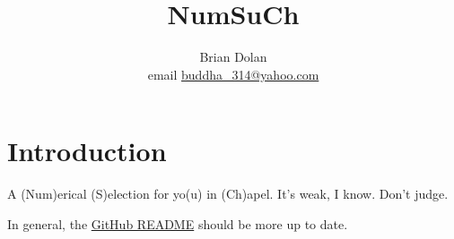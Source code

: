 \documentclass{article}
\title{NumSuCh}
\author{Brian Dolan \\ email \href{mailto:buddha\_314@yahoo.com}{buddha\_314@yahoo.com}}
\begin{document}
\maketitle

\section{Introduction}
A (Num)erical (S)election for yo(u) in (Ch)apel.  It's weak, I know.  Don't judge.

In general, the \href{https://github.com/buddha314/numsuch}{GitHub README} should be more up to date.
\end{document}
